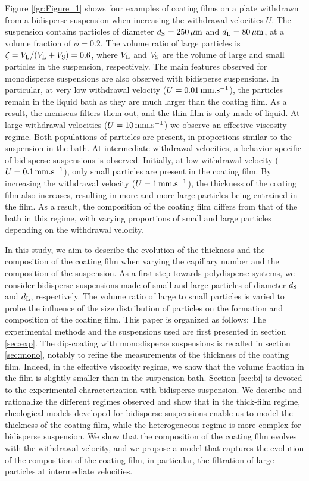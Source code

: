 \documentclass{jfm}
\begin{document}
Figure \ref{fgr:Figure_1} shows four examples of coating films on a plate withdrawn from a bidisperse suspension when increasing the withdrawal velocities $U$. The suspension contains particles of diameter $d_{\rm S}=250\,\mu{\rm m}$ and $d_{\rm L}=80\,\mu{\rm m}$, at a volume fraction of $\phi=0.2$. The volume ratio of large particles is $\zeta=V_{\rm L}/(V_{\rm L}+V_{\rm S})=0.6$, where $V_{\rm L}$ and $V_{\rm S}$ are the volume of large and small particles in the suspension, respectively. The main features observed for monodisperse suspensions are also observed with bidisperse suspensions. In particular, at very low withdrawal velocity ($U=0.01\,{\rm mm.s^{-1}}$), the particles remain in the liquid bath as they are much larger than the coating film. As a result, the meniscus filters them out, and the thin film is only made of liquid. At large withdrawal velocities ($U=10\,{\rm mm.s^{-1}}$) we observe an effective viscosity regime. Both populations of particles are present, in proportions similar to the suspension in the bath. At intermediate withdrawal velocities, a behavior specific of bidisperse suspensions is observed. Initially, at low withdrawal velocity ($U=0.1\,{\rm mm.s^{-1}}$), only small particles are present in the coating film. By increasing the withdrawal velocity ($U=1\,{\rm mm.s^{-1}}$), the thickness of the coating film also increases, resulting in more and more large particles being entrained in the film. As a result, the composition of the coating film differs from that of the bath in this regime, with varying proportions of small and large particles depending on the withdrawal velocity.

In this study, we aim to describe the evolution of the thickness and the composition of the coating film when varying the capillary number and the composition of the suspension. As a first step towards polydisperse systems, we consider bidisperse suspensions made of small and large particles of diameter $d_{\rm S}$ and $d_{\rm L}$, respectively. The volume ratio of large to small particles is varied to probe the influence of the size distribution of particles on the formation and composition of the coating film. This paper is organized as follows: The experimental methods and the suspensions used are first presented in section \ref{sec:exp}.
The dip-coating with monodisperse suspensions is recalled in section \ref{sec:mono}, notably to refine the measurements of the thickness of the coating film. Indeed, in the effective viscosity regime, we show that the volume fraction in the film is slightly smaller than in the suspension bath. Section \ref{sec:bi} is devoted to the experimental characterization with bidisperse suspension. We describe and rationalize the different regimes observed and show that in the thick-film regime, rheological models developed for bidisperse suspensions enable us to model the thickness of the coating film, while the heterogeneous regime is more complex for bidisperse suspension. We show that the composition of the coating film evolves with the withdrawal velocity, and we propose a model that captures the evolution of the composition of the coating film, in particular, the filtration of large particles at intermediate velocities.
\end{document}
